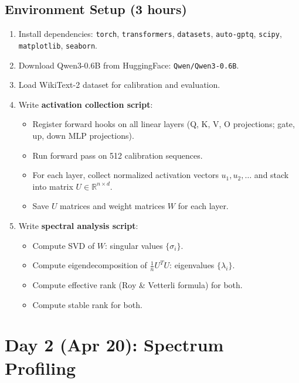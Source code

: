 \documentclass[11pt,a4paper]{article}
\begin{document}
\subsection{Environment Setup (3 hours)}
\begin{enumerate}
    \item Install dependencies: \texttt{torch}, \texttt{transformers}, \texttt{datasets}, \texttt{auto-gptq}, \texttt{scipy}, \texttt{matplotlib}, \texttt{seaborn}.
    \item Download Qwen3-0.6B from HuggingFace: \texttt{Qwen/Qwen3-0.6B}.
    \item Load WikiText-2 dataset for calibration and evaluation.
    \item Write \textbf{activation collection script}:
    \begin{itemize}
        \item Register forward hooks on all linear layers (Q, K, V, O projections; gate, up, down MLP projections).
        \item Run forward pass on 512 calibration sequences.
        \item For each layer, collect normalized activation vectors $u_1, u_2, \ldots$ and stack into matrix $U \in \mathbb{R}^{n \times d}$.
        \item Save $U$ matrices and weight matrices $W$ for each layer.
    \end{itemize}
    \item Write \textbf{spectral analysis script}:
    \begin{itemize}
        \item Compute SVD of $W$: singular values $\{\sigma_i\}$.
        \item Compute eigendecomposition of $\frac{1}{n}U^T U$: eigenvalues $\{\lambda_i\}$.
        \item Compute effective rank (Roy \& Vetterli formula) for both.
        \item Compute stable rank for both.
    \end{itemize}
\end{enumerate}

\section{Day 2 (Apr 20): Spectrum Profiling}
\end{document}
